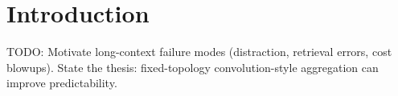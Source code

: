 \section{Introduction}

TODO: Motivate long-context failure modes (distraction, retrieval errors, cost blowups).
State the thesis: fixed-topology convolution-style aggregation can improve predictability.

